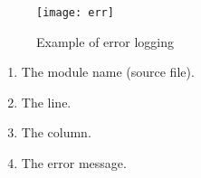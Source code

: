 \begin{slide}
    \begin{figure}[H]
        \centering
        \texttt{[image: err]}
        \caption{Example of error logging}
    \end{figure}
\end{slide}
\begin{slide}
    \begin{enumerate}
        \item The module name (source file).
        \item The line.
        \item The column.
        \item The error message.
    \end{enumerate}
\end{slide}
